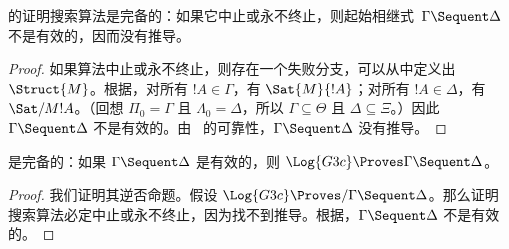\documentclass[../../../include/open-logic-section]{subfiles}
\begin{document}
\begin{cor}  的证明搜索算法是完备的：如果它中止或永不终止，则起始相继式~$\Gamma \Sequent \Delta$ 不是有效的，因而没有推导。
\end{cor}

\begin{proof}
  如果算法中止或永不终止，则存在一个失败分支，可以从中定义出 $\Struct{M}$。根据，对所有 $!A \in \Gamma$，有 $\Sat{M}{!A}$；对所有 $!A \in \Delta$，有 $\Sat/{M}{!A}$。（回想 $\Pi_0 = \Gamma$ 且 $\Lambda_0 = \Delta$，所以 $\Gamma \subseteq \Theta$ 且 $\Delta \subseteq \Xi$。）因此 $\Gamma \Sequent \Delta$ 不是有效的。由~ 的可靠性，$\Gamma \Sequent \Delta$ 没有推导。
\end{proof}

\begin{cor}
 是完备的：如果 $\Gamma \Sequent \Delta$ 是有效的，则 $\Log{G3c} \Proves \Gamma \Sequent \Delta$。
\end{cor}

\begin{proof}
  我们证明其逆否命题。假设 $\Log{G3c} \Proves/ \Gamma \Sequent \Delta$。那么证明搜索算法必定中止或永不终止，因为找不到推导。根据，$\Gamma \Sequent \Delta$ 不是有效的。
\end{proof}
\end{document}
